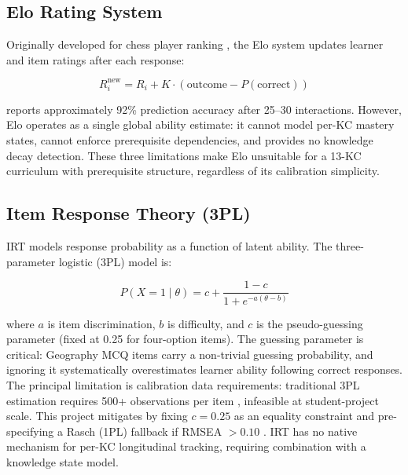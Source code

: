 \subsection{Elo Rating System}
\label{subsec:lr_elo}

Originally developed for chess player ranking \parencite{elo1978}, the Elo
system updates learner and item ratings after each response:

\begin{equation}
  R_i^{\text{new}} = R_i + K \cdot \left(\text{outcome} - P(\text{correct})\right)
  \label{eq:elo_update}
\end{equation}

\textcite{pelanek2016} reports approximately 92\% prediction accuracy after
25--30 interactions. However, Elo operates as a single global ability estimate:
it cannot model per-KC mastery states, cannot enforce prerequisite dependencies,
and provides no knowledge decay detection. These three limitations make Elo
unsuitable for a 13-KC curriculum with prerequisite structure, regardless of
its calibration simplicity.

\subsection{Item Response Theory (3PL)}
\label{subsec:lr_irt}

IRT \parencite{embretson2000} models response probability as a function of
latent ability. The three-parameter logistic (3PL) model \parencite{birnbaum1968}
is:

\begin{equation}
  P(X=1 \mid \theta) = c + \frac{1-c}{1 + e^{-a(\theta - b)}}
  \label{eq:irt_3pl}
\end{equation}

where $a$ is item discrimination, $b$ is difficulty, and $c$ is the
pseudo-guessing parameter (fixed at 0.25 for four-option items). The guessing
parameter is critical: Geography MCQ items carry a non-trivial guessing
probability, and ignoring it systematically overestimates learner ability
following correct responses. The principal limitation is calibration data
requirements: traditional 3PL estimation requires 500+ observations per item
\parencite{lord1980}, infeasible at student-project scale. This project
mitigates by fixing $c = 0.25$ as an equality constraint and pre-specifying
a Rasch (1PL) fallback if RMSEA $> 0.10$ \parencite{chalmers2012}. IRT has no
native mechanism for per-KC longitudinal tracking, requiring combination with
a knowledge state model.

